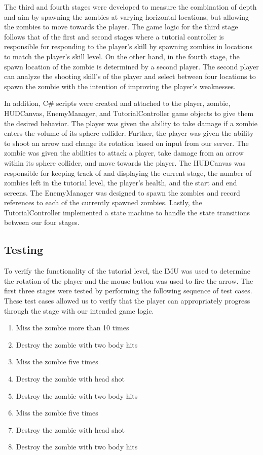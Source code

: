\documentclass[titlepage, 12pt]{scrartcl}
\begin{document}
    \par The third and fourth stages were developed to measure the combination of depth and aim by spawning the zombies at varying horizontal locations, but allowing the zombies to move towards the player. The game logic for the third stage follows that of the first and second stages where a tutorial controller is responsible for responding to the player's skill by spawning zombies in locations to match the player's skill level. On the other hand, in the fourth stage, the spawn location of the zombie is determined by a second player. The second player can analyze the shooting skill's of the player and select between four locations to spawn the zombie with the intention of improving the player's weaknesses.
    
    \par In addition, C\# scripts were created and attached to the player, zombie, HUDCanvas, EnemyManager, and TutorialController game objects to give them the desired behavior. The player was given the ability to take damage if a zombie enters the volume of its sphere collider. Further, the player was given the ability to shoot an arrow and change its rotation based on input from our server. The zombie was given the abilities to attack a player, take damage from an arrow within its sphere collider, and move towards the player. The HUDCanvas was responsible for keeping track of and displaying the current stage, the number of zombies left in the tutorial level, the player's health, and the start and end screens. The EnemyManager was designed to spawn the zombies and record references to each of the currently spawned zombies. Lastly, the TutorialController implemented a state machine to handle the state transitions between our four stages. 
    
    \subsection{Testing}
    To verify the functionality of the tutorial level, the IMU was used to determine the rotation of the player and the mouse button was used to fire the arrow. The first three stages were tested by performing the following sequence of test cases. These test cases allowed us to verify that the player can appropriately progress through the stage with our intended game logic. 
    
    \begin{enumerate}
        \item Miss the zombie more than 10 times
        \item Destroy the zombie with two body hits
        \item Miss the zombie five times
        \item Destroy the zombie with head shot
        \item Destroy the zombie with two body hits
        \item Miss the zombie five times
        \item Destroy the zombie with head shot
        \item Destroy the zombie with two body hits
    \end{enumerate}
    
\end{document}
